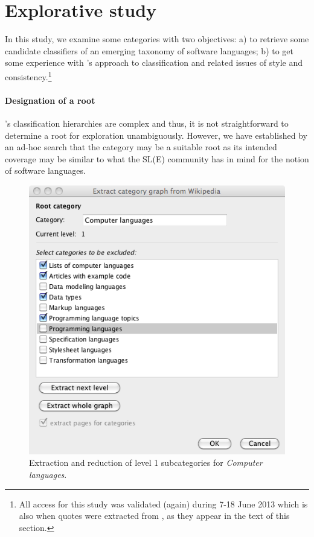 
\section{Explorative study}
\label{S:study}

In this study, we examine some \Wikipedia{} categories with two objectives: a) to retrieve some candidate classifiers of an emerging taxonomy of software languages; b) to get some experience with \Wikipedia's approach to classification and related issues of style and consistency.\footnote{All \Wikipedia{} access for this study was validated (again) during 7-18 June 2013 which is also when quotes were extracted from \Wikipedia, as they appear in the text of this section.}


\paragraph*{\textbf{Designation of a root}}

\Wikipedia's classification hierarchies are complex and thus, it is not straightforward to determine a root for exploration unambiguously. However, we have established by an ad-hoc search that the category  may be a suitable root as its intended coverage may be similar to what the SL(E) community has in mind for the notion of software languages. 


\begin{figure}[t!]
\begin{center}
\includegraphics[width=.5\textwidth]{figures/clLevel1.png}
\end{center}
\vspace{-66\in}
\caption{Extraction and reduction of level 1 subcategories for \emph{Computer languages}.}
\label{F:clLevel1}
\vspace{-42\in}
\end{figure}

